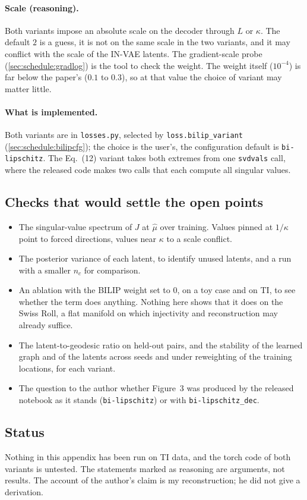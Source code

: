\paragraph{Scale (reasoning).}
Both variants impose an absolute scale on the decoder through $L$ or $\kappa$. The
default $2$ is a guess, it is not on the same scale in the two variants, and it may
conflict with the scale of the IN-VAE latents. The gradient-scale probe
(\cref{sec:schedule:gradlog}) is the tool to check the weight. The weight itself
($10^{-4}$) is far below the paper's ($0.1$ to $0.3$), so at that value the choice of
variant may matter little.

\paragraph{What is implemented.}
Both variants are in \texttt{losses.py}, selected by \texttt{loss.bilip\_variant}
(\cref{sec:schedule:bilipcfg}); the choice is the user's, the configuration default
is
\texttt{bi-lipschitz}. The Eq.~(12) variant takes both extremes from one
\texttt{svdvals} call, where the released code makes two calls that each compute all
singular values.

\subsection{Checks that would settle the open points}
\label{app:bilip:checks}
\begin{itemize}[leftmargin=1.5em]
\item The singular-value spectrum of $J$ at $\hat\mu$ over training. Values pinned at
      $1/\kappa$ point to forced directions, values near $\kappa$ to a scale
      conflict.
\item The posterior variance of each latent, to identify unused latents, and a run
      with a smaller $n_c$ for comparison.
\item An ablation with the BILIP weight set to $0$, on a toy case and on TI, to see
      whether the term does anything. Nothing here shows that it does on the Swiss
      Roll, a flat manifold on which injectivity and reconstruction may already
      suffice.
\item The latent-to-geodesic ratio on held-out pairs, and the stability of the
learned
      graph and of the latents across seeds and under reweighting of the training
      locations, for each variant.
\item The question to the author whether Figure~3 was produced by the released
notebook
      as it stands (\texttt{bi-lipschitz}) or with \texttt{bi-lipschitz\_dec}.
\end{itemize}

\subsection{Status}
\label{app:bilip:status}
Nothing in this appendix has been run on TI data, and the torch code of both variants
is
untested. The statements marked as reasoning are arguments, not results. The account
of
the author's claim is my reconstruction; he did not give a derivation.
